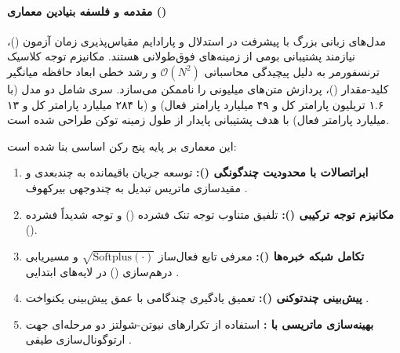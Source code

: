 \item {}

\paragraph*{مقدمه و فلسفه بنیادین معماری ()}
مدل‌های زبانی بزرگ با پیشرفت در استدلال و پارادایم مقیاس‌پذیری زمان آزمون ()، نیازمند پشتیبانی بومی از زمینه‌های فوق‌طولانی هستند. مکانیزم توجه کلاسیک ترنسفورمر \cite{vaswani2017attention} به دلیل پیچیدگی محاسباتی $\mathcal{O}(N^2)$ و رشد خطی ابعاد حافظه میانگیر کلید-مقدار ()، پردازش متن‌های میلیونی را ناممکن می‌سازد. سری  شامل دو مدل  (با ۱.۶ تریلیون پارامتر کل و ۴۹ میلیارد پارامتر فعال) و  (با ۲۸۴ میلیارد پارامتر کل و ۱۳ میلیارد پارامتر فعال) با هدف پشتیبانی پایدار از طول زمینه  توکن طراحی شده است. 

این معماری بر پایه پنج رکن اساسی بنا شده است:
\begin{enumerate}
    \item \textbf{ابراتصالات با محدودیت چندگونگی ():} توسعه جریان باقیمانده به چندبعدی و مقیدسازی ماتریس تبدیل به چندوجهی بیرکهوف \cite{xie2026mhc}.
    \item \textbf{مکانیزم توجه ترکیبی ():} تلفیق متناوب توجه تنک فشرده () و توجه شدیداً فشرده ().
    \item \textbf{تکامل شبکه خبره‌ها ():} معرفی تابع فعال‌ساز $\sqrt{\text{Softplus}(\cdot)}$ و مسیریابی درهم‌سازی () در لایه‌های ابتدایی \cite{dai2024deepseekmoe, roller2021hash}.
    \item \textbf{پیش‌بینی چندتوکنی ():} تعمیق یادگیری چندگامی با عمق پیش‌بینی یکنواخت \cite{gloeckle2024better}.
    \item \textbf{بهینه‌سازی ماتریسی با :} استفاده از تکرارهای نیوتن-شولتز دو مرحله‌ای جهت ارتوگونال‌سازی طیفی \cite{jordan2024muon, liu2025muon}.
\end{enumerate}

